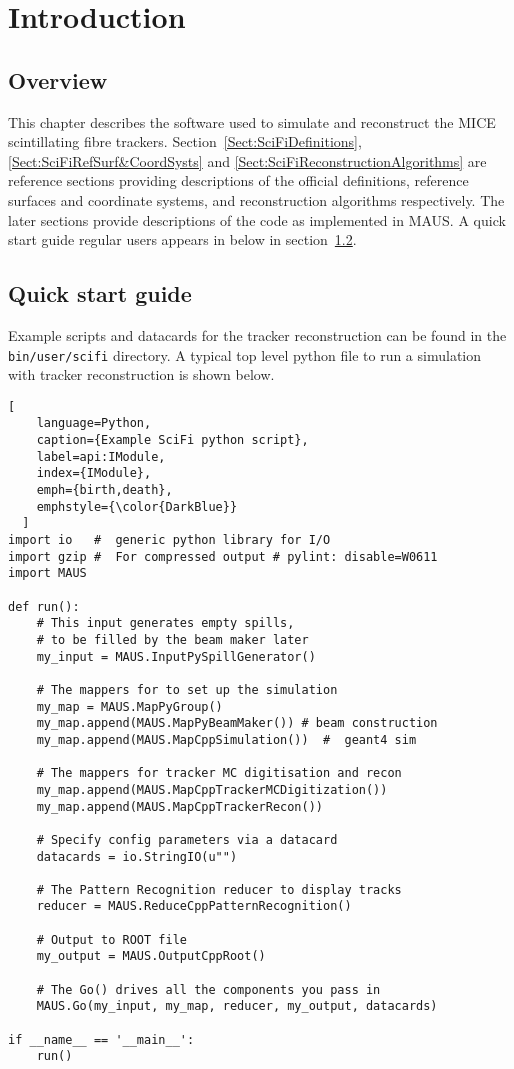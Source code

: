 \section{Introduction}
\label{Sect:SciFiIntroduction}

\subsection{Overview}
\label{SubSect:SciFiOverview}

This chapter describes the software used to simulate and reconstruct the MICE scintillating fibre trackers. Section~\ref{Sect:SciFiDefinitions}, \ref{Sect:SciFiRefSurf&CoordSysts} and \ref{Sect:SciFiReconstructionAlgorithms} are reference sections providing descriptions of the official definitions, reference surfaces and coordinate systems, and reconstruction algorithms respectively.  The later sections provide descriptions of the code as implemented in MAUS.  A quick start guide regular users appears in below in section~\ref{SubSect:SciFiQuickStart}.

\subsection{Quick start guide}
\label{SubSect:SciFiQuickStart}

Example scripts and datacards for the tracker reconstruction can be found in the \verb;bin/user/scifi; directory.  A typical top level python file to run a simulation with tracker reconstruction is shown below.

\begin{lstlisting}[
    language=Python,
    caption={Example SciFi python script},
    label=api:IModule, 
    index={IModule},
    emph={birth,death},
    emphstyle={\color{DarkBlue}}
  ]
import io   #  generic python library for I/O
import gzip #  For compressed output # pylint: disable=W0611
import MAUS

def run():
    # This input generates empty spills,
    # to be filled by the beam maker later
    my_input = MAUS.InputPySpillGenerator()

    # The mappers for to set up the simulation
    my_map = MAUS.MapPyGroup()
    my_map.append(MAUS.MapPyBeamMaker()) # beam construction
    my_map.append(MAUS.MapCppSimulation())  #  geant4 sim
    
    # The mappers for tracker MC digitisation and recon
    my_map.append(MAUS.MapCppTrackerMCDigitization()) 
    my_map.append(MAUS.MapCppTrackerRecon())
    
    # Specify config parameters via a datacard
    datacards = io.StringIO(u"")

    # The Pattern Recognition reducer to display tracks
    reducer = MAUS.ReduceCppPatternRecognition()

    # Output to ROOT file
    my_output = MAUS.OutputCppRoot()

    # The Go() drives all the components you pass in
    MAUS.Go(my_input, my_map, reducer, my_output, datacards)

if __name__ == '__main__':
    run()
\end{lstlisting}

